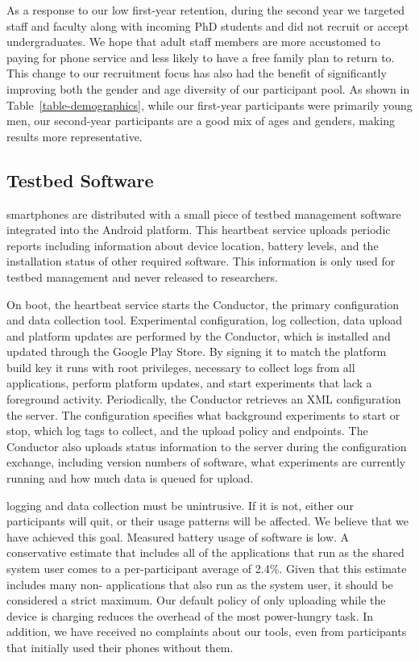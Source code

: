 As a response to our low first-year retention, during the second year we
targeted staff and faculty along with incoming PhD students and did not
recruit or accept undergraduates. We hope that adult staff members are more
accustomed to paying for phone service and less likely to have a free family
plan to return to. This change to our recruitment focus has also had the
benefit of significantly improving both the gender and age diversity of our
participant pool. As shown in Table~\ref{table-demographics}, while our
first-year participants were primarily young men, our second-year
participants are a good mix of ages and genders, making results more
representative.

\subsection{Testbed Software}

\PhoneLab{} smartphones are distributed with a small piece of testbed
management software integrated into the Android platform. This heartbeat
service uploads periodic reports including information about device location,
battery levels, and the installation status of other required \PhoneLab{}
software. This information is only used for testbed management and never
released to researchers.

On boot, the heartbeat service starts the \PhoneLab{} Conductor, the primary
\PhoneLab{} configuration and data collection tool. Experimental
configuration, log collection, data upload and platform updates are performed
by the Conductor, which is installed and updated through the Google Play
Store. By signing it to match the platform build key it runs with root
privileges, necessary to collect logs from all applications, perform platform
updates, and start experiments that lack a foreground activity. Periodically,
the Conductor retrieves an XML configuration the \PhoneLab{} server. The
configuration specifies what background experiments to start or stop, which
log tags to collect, and the upload policy and endpoints. The Conductor also
uploads status information to the server during the configuration exchange,
including version numbers of \PhoneLab{} software, what experiments are
currently running and how much data is queued for upload.

\PhoneLab{} logging and data collection must be unintrusive. If it is not,
either our participants will quit, or their usage patterns will be affected.
We believe that we have achieved this goal. Measured battery usage of
\PhoneLab{} software is low. A conservative estimate that includes all of the
applications that run as the shared system user comes to a per-participant
average of 2.4\%. Given that this estimate includes many non-\PhoneLab{}
applications that also run as the system user, it should be considered a
strict maximum. Our default policy of only uploading while the device is
charging reduces the overhead of the most power-hungry task. In addition, we
have received no complaints about our tools, even from participants that
initially used their phones without them.

